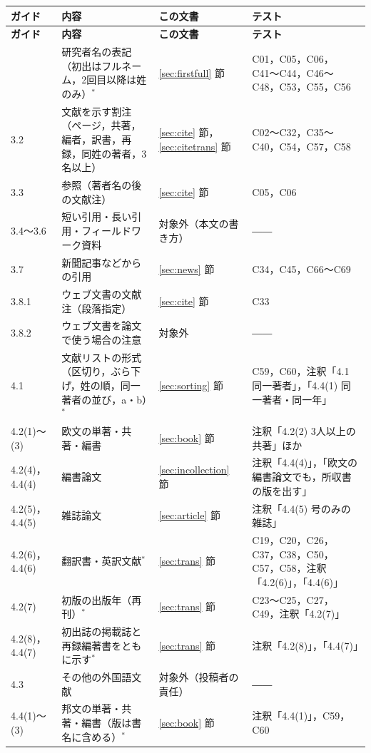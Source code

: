 \begin{longtable}{@{}L{.11\textwidth}L{.31\textwidth}L{.17\textwidth}L{.26\textwidth}@{}}
\toprule
\textbf{ガイド} & \textbf{内容} & \textbf{この文書} & \textbf{テスト} \\
\midrule
\endfirsthead
\toprule
\textbf{ガイド} & \textbf{内容} & \textbf{この文書} & \textbf{テスト} \\
\midrule
\endhead
\bottomrule
{} & 研究者名の表記（初出はフルネーム，2回目以降は姓のみ）$^{*}$ & \ref{sec:firstfull} 節 & C01，C05，C06，C41〜C44，C46〜C48，C53，C55，C56 \\
3.2 & 文献を示す割注（ページ，共著，編者，訳書，再録，同姓の著者，3名以上） & \ref{sec:cite} 節，\ref{sec:citetrans} 節 & C02〜C32，C35〜C40，C54，C57，C58 \\
3.3 & 参照（著者名の後の文献注） & \ref{sec:cite} 節 & C05，C06 \\
3.4〜3.6 & 短い引用・長い引用・フィールドワーク資料 & 対象外（本文の書き方） & ―― \\
3.7 & 新聞記事などからの引用 & \ref{sec:news} 節 & C34，C45，C66〜C69 \\
3.8.1 & ウェブ文書の文献注（段落指定） & \ref{sec:cite} 節 & C33 \\
3.8.2 & ウェブ文書を論文で使う場合の注意 & 対象外 & ―― \\
4.1 & 文献リストの形式（区切り，ぶら下げ，姓の順，同一著者の並び，a・b）$^{*}$ & \ref{sec:sorting} 節 & C59，C60，注釈「4.1 同一著者」，「4.4(1) 同一著者・同一年」 \\
4.2(1)〜(3) & 欧文の単著・共著・編書 & \ref{sec:book} 節 & 注釈「4.2(2) 3人以上の共著」ほか \\
4.2(4)，4.4(4) & 編書論文 & \ref{sec:incollection} 節 & 注釈「4.4(4)」，「欧文の編書論文でも，所収書の版を出す」 \\
4.2(5)，4.4(5) & 雑誌論文 & \ref{sec:article} 節 & 注釈「4.4(5) 号のみの雑誌」 \\
4.2(6)，4.4(6) & 翻訳書・英訳文献$^{*}$ & \ref{sec:trans} 節 & C19，C20，C26，C37，C38，C50，C57，C58，注釈「4.2(6)」，「4.4(6)」 \\
4.2(7) & 初版の出版年（再刊）$^{*}$ & \ref{sec:trans} 節 & C23〜C25，C27，C49，注釈「4.2(7)」 \\
4.2(8)，4.4(7) & 初出誌の掲載誌と再録編著書をともに示す$^{*}$ & \ref{sec:trans} 節 & 注釈「4.2(8)」，「4.4(7)」 \\
4.3 & その他の外国語文献 & 対象外（投稿者の責任） & ―― \\
4.4(1)〜(3) & 邦文の単著・共著・編書（版は書名に含める）$^{*}$ & \ref{sec:book} 節 & 注釈「4.4(1)」，C59，C60 \\

\end{longtable}
